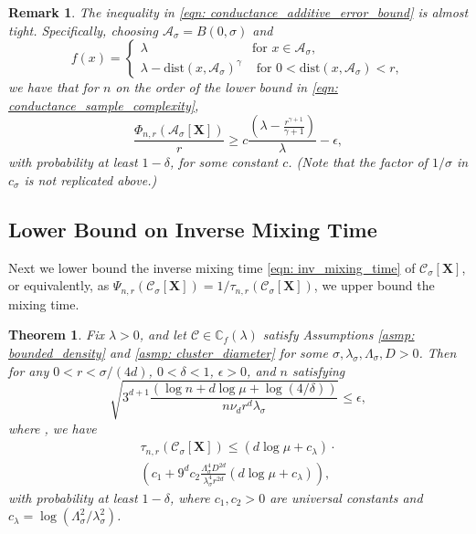 \documentclass{article}
\newcommand{\1}{\mathbf{1}}
\newcommand{\dist}{\mathrm{dist}}
\newcommand{\Xbf}{\mathbf{X}}
\newcommand{\Cbb}{\mathbb{C}}
\newcommand{\Cset}{\mathcal{C}}
\newcommand{\Aset}{\mathcal{A}}
\newcommand{\Asig}{\Aset_{\sigma}}
\newcommand{\Csig}{\Cset_{\sigma}}
\theoremstyle{aldenthm}
\newtheorem{theorem}{Theorem}
\theoremstyle{aldenrmrk}
\newtheorem{remark}{Remark}
\begin{document}
\begin{remark}
The inequality in \eqref{eqn: conductance_additive_error_bound} is almost
tight. Specifically, choosing $\Asig = B(0,\sigma)$ and
$$
 f(x)  = \begin{cases}
   \lambda &\text{for $x \in \Asig$}, \\
   \lambda - \dist(x,\Asig)^{\gamma} & \text{ for $0 < \dist(x,\Asig) < r$}, 
\end{cases}
$$
we have that for $n$ on the order of the lower bound in \eqref{eqn: 
  conductance_sample_complexity}, 
$$
  \frac{\Phi_{n,r}(\Asig[\mathbf{X}])}{r} \geq c \frac{(\lambda -
    \frac{r^{\gamma+1}}{\gamma+1})}{\lambda} - \epsilon,
$$
with probability at least $1 - \delta$, for some constant $c$. (Note that the
factor of $1 / \sigma$ in $c_{\sigma}$ is not replicated above.)
\end{remark}

\subsection{Lower Bound on Inverse Mixing Time}

Next we lower bound the inverse mixing time \eqref{eqn: inv_mixing_time} of 
$\Csig[\Xbf]$, or equivalently, as $\Psi_{n,r}(\Csig[\Xbf]) =
1/\tau_{n,r}(\Csig[\Xbf])$, we upper bound the mixing time. 

\begin{theorem}
\label{thm: inverse_mixing_time_lower_bound_nonconvex}
Fix $\lambda > 0$, and let $\Cset \in \Cbb_f(\lambda)$ satisfy
Assumptions \ref{asmp: bounded_density} and \ref{asmp: cluster_diameter} 
for some $\sigma, \lambda_{\sigma}, \Lambda_{\sigma}, D > 0$. Then for any $0 <
r < \sigma/(4d)$, $0 < \delta < 1$, $\epsilon > 0$, and $n$ satisfying 
$$
\sqrt{3^{d+1}\frac{(\log n + d\log \mu + \log(4/\delta))}{n \nu_d r^d
    \lambda_{\sigma}}} \leq \epsilon, 
$$
where , we have
\begin{multline}
\label{eqn: inverse_mixing_time_lower_bound_nonconvex}
\tau_{n,r}(\Csig[\Xbf]) \leq (d \log \mu + c_{\lambda}) \cdot \\  
\left(c_1 + 9^d c_2 \frac{\Lambda_{\sigma}^4D^{2d}}{\lambda_{\sigma}^4r^{2d}}\left(d
    \log \mu + c_{\lambda}\right)\right),
\end{multline}
with probability at least $1 - \delta$, where $c_1,c_2>0$ are universal constants
 and $c_{\lambda} = \log(\Lambda_{\sigma}^2/ 
\lambda_{\sigma}^2)$.   
\end{theorem}
\end{document}
